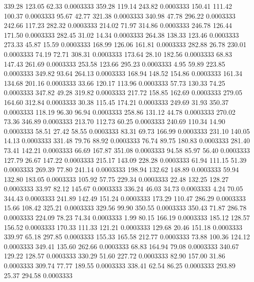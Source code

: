  339.28  123.05   62.33   0.0003333
 359.28  119.14  243.82   0.0003333
 150.41  111.42  100.37   0.0003333
  95.67   42.77  321.38   0.0003333
 340.98   47.78  296.22   0.0003333
 242.66  117.23  282.32   0.0003333
 214.02   71.97  314.86   0.0003333
 246.78  126.44  171.50   0.0003333
 282.45   31.02   14.34   0.0003333
 264.38  138.33  123.46   0.0003333
 273.33   45.87   15.59   0.0003333
 168.99  126.06  161.81   0.0003333
 282.88   26.78  230.01   0.0003333
  74.19   72.71  308.31   0.0003333
 173.64   28.10  182.56   0.0003333
  68.83  147.43  261.69   0.0003333
 253.58  123.66  295.23   0.0003333
   4.95   59.89  223.85   0.0003333
 349.82   93.64  264.13   0.0003333
 168.94  148.52  154.86   0.0003333
 161.34  134.68  201.16   0.0003333
  33.66  120.17  113.96   0.0003333
  57.73  130.33   74.25   0.0003333
 347.82   49.28  319.82   0.0003333
 217.72  158.85  162.69   0.0003333
 279.05  164.60  312.84   0.0003333
  30.38  115.45  174.21   0.0003333
 249.69   31.93  350.37   0.0003333
 118.19   96.30   96.94   0.0003333
 258.86  131.12   44.78   0.0003333
 270.02   73.36  346.89   0.0003333
 213.70  112.73   60.25   0.0003333
 240.69  110.34   14.90   0.0003333
  58.51   27.42   58.55   0.0003333
  83.31   69.73  166.99   0.0003333
 231.10  140.05   14.13   0.0003333
 331.48   79.76   88.92   0.0003333
  76.74   89.75  180.83   0.0003333
 281.40   73.41  142.21   0.0003333
  66.69  167.87  351.08   0.0003333
  94.58   85.97   56.40   0.0003333
 127.79   26.67  147.22   0.0003333
 215.17  143.09  228.28   0.0003333
  61.94  111.15   51.39   0.0003333
 269.39   77.80  241.14   0.0003333
 198.94  132.62  148.89   0.0003333
  59.94  132.80  183.05   0.0003333
 105.92   57.75  229.34   0.0003333
  22.48  132.25  128.27   0.0003333
  33.97   82.12  145.67   0.0003333
 336.24   46.03   34.73   0.0003333
   4.24   70.05  344.43   0.0003333
 241.89  142.49  151.24   0.0003333
 173.29  110.47  286.29   0.0003333
  15.66  108.42  325.21   0.0003333
 329.56   99.90  350.55   0.0003333
 350.43   71.87  286.78   0.0003333
 224.09   78.23   74.34   0.0003333
   1.99   80.15  166.19   0.0003333
 185.12  128.57  156.52   0.0003333
 170.33  111.33  121.21   0.0003333
 129.68   20.46  151.18   0.0003333
 339.97   65.18  297.85   0.0003333
 155.33  165.58  212.77   0.0003333
  73.88  100.36  124.12   0.0003333
 349.41  135.60  262.66   0.0003333
  68.83  164.94   79.08   0.0003333
 340.67  129.22  128.57   0.0003333
 330.29   51.60  227.72   0.0003333
  82.90  157.00   31.86   0.0003333
 309.74   77.77  189.55   0.0003333
 338.41   62.54   86.25   0.0003333
 293.89   25.37  294.58   0.0003333
